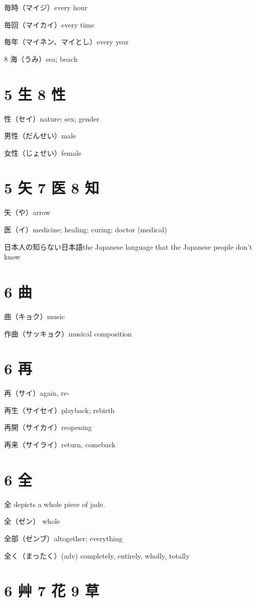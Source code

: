 毎時（マイジ）every hour

毎回（マイカイ）every time

毎年（マイネン、マイとし）every year

8 海（うみ）sea; beach

\section{5 生 8 性}

性（セイ）nature; sex; gender

男性（だんせい）male

女性（じょせい）female

\section{5 矢 7 医 8 知}

矢（や）arrow

医（イ）medicine; healing; curing; doctor (medical)

日本人の知らない日本語the Japanese language that the Japanese people don't know

\section{6 曲}

曲（キョク）music

作曲（サッキョク）musical composition

\section{6 再}

再（サイ）again, re-

再生（サイセイ）playback; rebirth

再開（サイカイ）reopening

再来（サイライ）return, comeback

\section{6 全}

全 depicts a whole piece of jade.

全（ゼン） whole

全部（ゼンブ）altogether; everything

全く（まったく）(adv) completely, entirely, wholly, totally

\section{6 艸 7 花 9 草}

